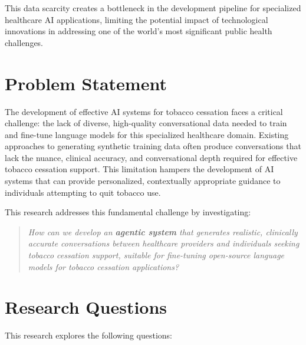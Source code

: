 This data scarcity creates a bottleneck in the development pipeline for specialized healthcare AI applications, limiting the potential impact of technological innovations in addressing one of the world's most significant public health challenges.

\section{Problem Statement}
\begin{tcolorbox}[colback=gray!5!white,colframe=gray!75!black,title=Research Problem]
The development of effective AI systems for tobacco cessation faces a critical challenge: the lack of diverse, high-quality conversational data needed to train and fine-tune language models for this specialized healthcare domain. Existing approaches to generating synthetic training data often produce conversations that lack the nuance, clinical accuracy, and conversational depth required for effective tobacco cessation support. This limitation hampers the development of AI systems that can provide personalized, contextually appropriate guidance to individuals attempting to quit tobacco use.
\end{tcolorbox}

This research addresses this fundamental challenge by investigating:

\begin{quote}
\textit{How can we develop an \textbf{agentic system} that generates realistic, clinically accurate conversations between healthcare providers and individuals seeking tobacco cessation support, suitable for fine-tuning open-source language models for tobacco cessation applications?}
\end{quote}

\section{Research Questions}
This research explores the following questions:

